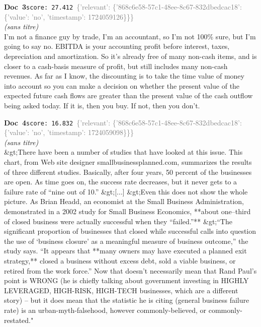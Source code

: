 \documentclass[a4paper,11pt]{article}
\begin{document}
\begin{docenv}
{\footnotesize\textcolor{doccolor}{\textbf{Doc~3}}}\hfill{\tiny\texttt{score:~27.412}}\ {\tiny\textcolor{gray}{\{'relevant': \{'868c6e58-57c1-48ee-8c67-832dbedcac18': \{'value': 'no', 'timestamp': 1724059126\}\}\}}}\\[3pt]
{\small\textit{(sans titre)}}\\[2pt]
\vspace{2pt}
{\footnotesize 
I'm not a finance guy by trade, I'm an accountant, so I'm not 100\% sure, but I'm going to say no.   EBITDA is your accounting profit before interest, taxes, depreciation and amortization. So it's already free of many non-cash items, and is closer to a cash-basis measure of profit, but still includes many non-cash revenues.   As far as I know, the discounting is to take the time value of money into account so you can make a decision on whether the present value of the expected future cash flows are greater than the present value of the cash outflow being asked today. If it is, then you buy. If not, then you don't.}
\end{docenv}
\begin{docenv}
{\footnotesize\textcolor{doccolor}{\textbf{Doc~4}}}\hfill{\tiny\texttt{score:~16.832}}\ {\tiny\textcolor{gray}{\{'relevant': \{'868c6e58-57c1-48ee-8c67-832dbedcac18': \{'value': 'no', 'timestamp': 1724059098\}\}\}}}\\[3pt]
{\small\textit{(sans titre)}}\\[2pt]
\vspace{2pt}
{\footnotesize 
\&gt;There have been a number of studies that have looked at this issue. This chart, from Web site designer smallbusinessplanned.com, summarizes the results of three different studies. Basically, after four years, 50 percent of the businesses are open. As time goes on, the success rate decreases, but it never gets to a failure rate of “nine out of 10.” \&gt;[...] \&gt;Even this does not show the whole picture. As Brian Headd, an economist at the Small Business Administration, demonstrated in a 2002 study for Small Business Economics, **about one–third of closed business were actually successful when they “failed.”** \&gt;“The significant proportion of businesses that closed while successful calls into question the use of ‘business closure’ as a meaningful measure of business outcome,” the study says. “It appears that **many owners may have executed a planned exit strategy,** closed a business without excess debt, sold a viable business, or retired from the work force.” Now that doesn't necessarily mean that Rand Paul's point is WRONG (he is chiefly talking about government investing in HIGHLY LEVERAGED, HIGH-RISK, HIGH-TECH businesses, which are a different story) -- but it does mean that the statistic he is citing (general business failure rate) is an urban-myth-falsehood, however commonly-believed, or commonly-restated."}
\end{docenv}
\end{document}
